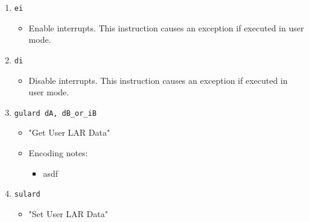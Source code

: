 \documentclass{article}
\begin{document}
\begin{itemize}
\begin{enumerate}
			\item \texttt{ei}
				\begin{itemize}
				\item Enable interrupts.  This instruction causes an
					exception if executed in user mode.
				\end{itemize}
			\item \texttt{di}
				\begin{itemize}
				\item Disable interrupts.  This instruction causes an
					exception if executed in user mode.
				\end{itemize}
			\item \texttt{gulard dA, dB\_or\_iB}
				\begin{itemize}
				\item "Get User LAR Data"
				\item Encoding notes:
					\begin{itemize}
					\item asdf
					\end{itemize}
				\end{itemize}
			\item \texttt{sulard}
				\begin{itemize}
				\item "Set User LAR Data"
				\end{itemize}

			\end{enumerate}
		\end{itemize}



\end{document}
